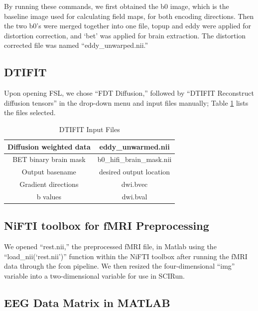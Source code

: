 By running these commands, we first obtained the b0 image, which is the baseline image used for calculating field maps, for both encoding directions. Then the two b0's were merged together into one file, topup and eddy were applied for distortion correction, and `bet' was applied for brain extraction. The distortion corrected file was named ``eddy\_unwarped.nii.''

\subsection{DTIFIT}
\label{sec:dtifit}

Upon opening FSL, we chose ``FDT Diffusion,'' followed by ``DTIFIT Reconstruct diffusion tensors'' in the drop-down menu and input files manually; Table \ref{tab:dtifit} lists the files selected.

\begin{table}[H]
\centering
\caption{DTIFIT Input Files}
\label{tab:dtifit}
\begin{tabular}{|c|c|}
\hline
Diffusion weighted data & eddy\_unwarmed.nii        \\ \hline
BET binary brain mask   & b0\_hifi\_brain\_mask.nii \\ \hline
Output basename          & desired output location   \\ \hline
Gradient directions     & dwi.bvec                  \\ \hline
b values                & dwi.bval                  \\ \hline
\end{tabular}
\end{table}

\subsection{NiFTI toolbox for fMRI Preprocessing}
\label{sec:nifti}

We opened ``rest.nii,'' the preprocessed fMRI file, in Matlab using the ``load\_nii(`rest.nii')'' function within the NiFTI toolbox \cite{ref:nifti} after running the fMRI data through the fcon pipeline. We then resized the four-dimensional ``img'' variable into a two-dimensional variable for use in SCIRun.

\subsection{EEG Data Matrix in MATLAB}
\label{ref:eegmatlab}

